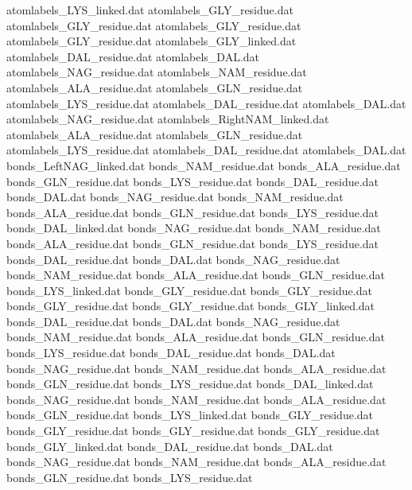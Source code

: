 atomlabels_LYS_linked.dat       
atomlabels_GLY_residue.dat
atomlabels_GLY_residue.dat
atomlabels_GLY_residue.dat
atomlabels_GLY_residue.dat
atomlabels_GLY_linked.dat
atomlabels_DAL_residue.dat      
atomlabels_DAL.dat              
atomlabels_NAG_residue.dat      
atomlabels_NAM_residue.dat      
atomlabels_ALA_residue.dat      
atomlabels_GLN_residue.dat      
atomlabels_LYS_residue.dat      
atomlabels_DAL_residue.dat      
atomlabels_DAL.dat              
atomlabels_NAG_residue.dat      
atomlabels_RightNAM_linked.dat  
atomlabels_ALA_residue.dat      
atomlabels_GLN_residue.dat      
atomlabels_LYS_residue.dat      
atomlabels_DAL_residue.dat      
atomlabels_DAL.dat              
bonds_LeftNAG_linked.dat        
bonds_NAM_residue.dat           
bonds_ALA_residue.dat           
bonds_GLN_residue.dat           
bonds_LYS_residue.dat           
bonds_DAL_residue.dat           
bonds_DAL.dat                   
bonds_NAG_residue.dat           
bonds_NAM_residue.dat           
bonds_ALA_residue.dat           
bonds_GLN_residue.dat           
bonds_LYS_residue.dat           
bonds_DAL_linked.dat            
bonds_NAG_residue.dat           
bonds_NAM_residue.dat           
bonds_ALA_residue.dat           
bonds_GLN_residue.dat           
bonds_LYS_residue.dat           
bonds_DAL_residue.dat           
bonds_DAL.dat                   
bonds_NAG_residue.dat           
bonds_NAM_residue.dat           
bonds_ALA_residue.dat           
bonds_GLN_residue.dat           
bonds_LYS_linked.dat            
bonds_GLY_residue.dat
bonds_GLY_residue.dat
bonds_GLY_residue.dat
bonds_GLY_residue.dat
bonds_GLY_linked.dat
bonds_DAL_residue.dat           
bonds_DAL.dat                   
bonds_NAG_residue.dat           
bonds_NAM_residue.dat           
bonds_ALA_residue.dat           
bonds_GLN_residue.dat           
bonds_LYS_residue.dat           
bonds_DAL_residue.dat           
bonds_DAL.dat                   
bonds_NAG_residue.dat           
bonds_NAM_residue.dat           
bonds_ALA_residue.dat           
bonds_GLN_residue.dat           
bonds_LYS_residue.dat           
bonds_DAL_linked.dat            
bonds_NAG_residue.dat           
bonds_NAM_residue.dat           
bonds_ALA_residue.dat           
bonds_GLN_residue.dat           
bonds_LYS_linked.dat            
bonds_GLY_residue.dat
bonds_GLY_residue.dat
bonds_GLY_residue.dat
bonds_GLY_residue.dat
bonds_GLY_linked.dat
bonds_DAL_residue.dat           
bonds_DAL.dat                   
bonds_NAG_residue.dat           
bonds_NAM_residue.dat           
bonds_ALA_residue.dat           
bonds_GLN_residue.dat           
bonds_LYS_residue.dat           
